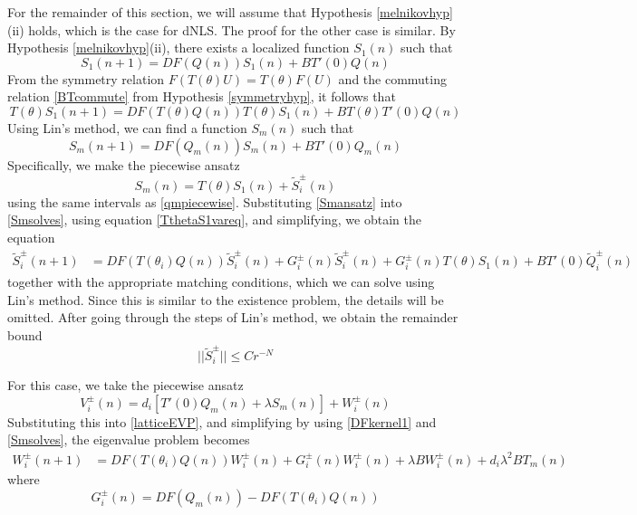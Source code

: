 \documentclass[12pt]{article}
\begin{document}
For the remainder of this section, we will assume that Hypothesis \ref{melnikovhyp}(ii) holds, which is the case for dNLS. The proof for the other case is similar. By Hypothesis \ref{melnikovhyp}(ii), there exists a localized function $S_1(n)$ such that 
\begin{equation}\label{S1vareq}
S_1(n+1) = DF(Q(n)) S_1(n) + B T'(0) Q(n)
\end{equation}
From the symmetry relation $F(T(\theta)U) = T(\theta)F(U)$ and the commuting relation \eqref{BTcommute} from Hypothesis \ref{symmetryhyp}, it follows that
\begin{equation}\label{TthetaS1vareq}
T(\theta)S_1(n+1) = DF(T(\theta)Q(n)) T(\theta)S_1(n) + B T(\theta) T'(0)Q(n)
\end{equation}
Using Lin's method, we can find a function $S_m(n)$ such that
\begin{equation}\label{Smsolves}
S_m(n+1) = DF(Q_m(n)) S_m(n) + B T'(0) Q_m(n)
\end{equation}
Specifically, we make the piecewise ansatz 
\begin{equation}\label{Smansatz}
S_m(n) = T(\theta)S_1(n) + \tilde{S}_i^\pm(n)
\end{equation}
using the same intervals as \eqref{qmpiecewise}. Substituting \eqref{Smansatz} into \eqref{Smsolves}, using equation \eqref{TthetaS1vareq}, and simplifying, we obtain the equation
\begin{align*}
\tilde{S}_i^\pm(n+1) 
&= DF(T(\theta_i)Q(n)) \tilde{S}_i^\pm(n)
+ G_i^\pm(n)\tilde{S}_i^\pm(n) + G_i^\pm(n) T(\theta)S_1(n) + B T'
(0) \tilde{Q}_i^\pm(n)
\end{align*}
together with the appropriate matching conditions, which we can solve using Lin's method. Since this is similar to the existence problem, the details will be omitted. After going through the steps of Lin's method, we obtain the remainder bound
\begin{equation}\label{Sipmbound}
|| \tilde{S}_i^\pm || \leq C r^{-N}
\end{equation}

For this case, we take the piecewise ansatz
\begin{equation}\label{Viansatz2}
V_i^\pm(n) = 
d_i [ T'(0)Q_m(n) + \lambda S_m(n) ] + W_i^\pm(n)
\end{equation}
Substituting this into \eqref{latticeEVP}, and simplifying by using \eqref{DFkernel1} and \eqref{Smsolves}, the eigenvalue problem becomes
\begin{align}\label{Weq1}
W_i^\pm(n+1)
&= DF(T(\theta_i) Q(n) ) W_i^\pm(n) + G_i^\pm(n)W_i^\pm(n) + \lambda B W_i^\pm(n) + d_i \lambda^2 B T_m(n)
\end{align}
where
\begin{equation}
G_i^\pm(n) = DF(Q_m(n)) - DF(T(\theta_i) Q(n) )
\end{equation}
\end{document}
